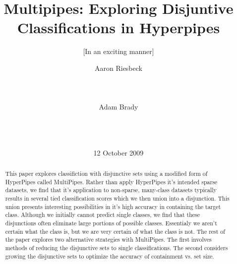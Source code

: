 \documentclass{acm_proc_article-sp}
\begin{document}
\title{Multipipes: Exploring Disjuntive Classifications in Hyperpipes}
\subtitle{[In an exciting manner]
}

%
\author{
%
\alignauthor
Aaron Riesbeck\\
       \\
       \\
       \\
\alignauthor
Adam Brady\\
       \\
       \\
       \\
}
\date{12 October 2009}

\maketitle
\begin{abstract}

This paper explores classifiction with disjunctive sets using a modified form of HyperPipes called MultiPipes. Rather than apply HyperPipes it's intended sparse datasets, we find that it's application to non-sparse, many-class datasets typically results in several tied classification scores which we then union into a disjunction. This union presents interesting possibilities in it's high accuracy in containing the target class. Although we initially cannot predict single classes, we find that these disjunctions often eliminate large portions of possible classes. Essentialy we aren't certain what the class is, but we are very certain of what the class is not. The rest of the paper explores two alternative strategies with MultiPipes. The first involves methods of reducing the disjunctive sets to single classifications. The second considers growing the disjunctive sets to optimize the accuracy of containment vs. set size.

\end{abstract}
\end{document}
